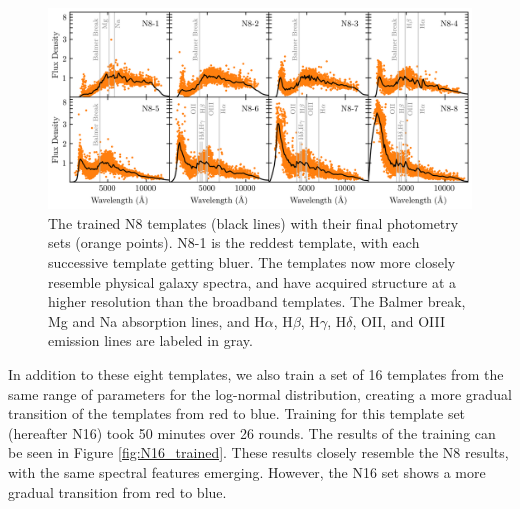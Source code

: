 \begin{figure}
    \centering
    \includegraphics{figures/N8_trained.png}
    \caption{The trained N8 templates (black lines) with their final photometry sets (orange points). N8-1 is the reddest template, with each successive template getting bluer. The templates now more closely resemble physical galaxy spectra, and have acquired structure at a higher resolution than the broadband templates. The Balmer break, Mg and Na absorption lines, and H$\alpha$, H$\beta$, H$\gamma$, H$\delta$, OII, and OIII emission lines are labeled in gray.}
    \label{fig:N8_trained}
\end{figure}

In addition to these eight templates, we also train a set of 16 templates from the same range of parameters for the log-normal distribution, creating a more gradual transition of the templates from red to blue. 
Training for this template set (hereafter N16) took 50 minutes over 26 rounds.
The results of the training can be seen in Figure \ref{fig:N16_trained}.
These results closely resemble the N8 results, with the same spectral features emerging.
However, the N16 set shows a more gradual transition from red to blue.


